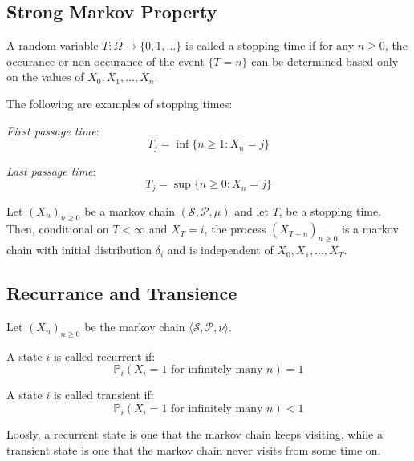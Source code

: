 \subsection{Strong Markov Property}
\begin{definition}
    A random variable \(T : \Omega \rightarrow \{0,1,\dots \} \) is called a stopping time if for any \(n \geq 0\),
    the occurance or non occurance of the event \(\{T = n\}\) can be determined based only on
     the values of \(X_0, X_1, \dots , X_n\).  
\end{definition}
\begin{example} The following are examples of stopping times:
    \item \emph{First passage time}:
    \[
        T_j = \inf \{n \geq 1 : X_n = j\}
    \]
    \item \emph{Last passage time}:
    \[
        T_j = \sup \{n \geq 0 : X_n = j\}
    \]
\end{example}
\begin{definition}
    Let \((X_n)_{n \geq 0}\) be a markov chain \((\mathcal{S} , \mathcal{P} , \mu )\) and let \(T\), be a stopping
    time. Then, conditional on \(T < \infty \) and \(X_T = i\), the process \((X_{T+n})_{n \geq 0}\) is a markov
    chain with initial distribution \(\delta _i\) and is independent of \(X_0, X_1, \dots , X_T\).
\end{definition}

\subsection{Recurrance and Transience}
Let \((X_n)_{n \geq 0}\) be the markov chain \(\langle \mathcal{S} , \mathcal{P} , \nu \rangle\).
\begin{definition}[Recurrence]
    A state \(i\) is called recurrent if:
    \[
        \mathbb{P}_i (X_i = 1 \text{ for infinitely many } n) = 1
    \] 
\end{definition}
\begin{definition}[Transience]
    A state \(i\) is called transient if:
    \[
        \mathbb{P}_i (X_i = 1 \text{ for infinitely many } n) < 1
    \]
\end{definition}
Loosly, a recurrent state is one that the markov chain keeps visiting, while a transient state is one that
the markov chain never visits from some time on.

